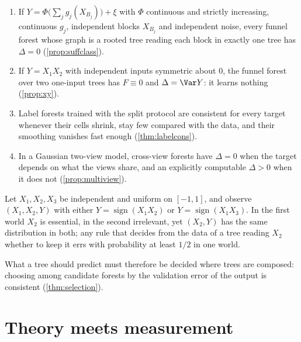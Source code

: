 \begin{proposition}\label{prop:tasks}
\leavevmode
\begin{enumerate}[label=(\alph*),leftmargin=*,noitemsep]
\item If $Y=\Phi\bigl(\sum_jg_j(X_{B_j})\bigr)+\xi$ with $\Phi$ continuous and strictly
  increasing, continuous $g_j$, independent blocks $X_{B_j}$ and independent noise, every
  funnel forest whose graph is a rooted tree reading each block in exactly one tree has
  $\Delta=0$ (\cref{prop:suffclass}).
\item If $Y=X_1X_2$ with independent inputs symmetric about $0$, the funnel forest over two
  one-input trees has $F\equiv0$ and $\Delta=\Var Y$: it learns nothing (\cref{prop:xy}).
\item Label forests trained with the split protocol are consistent for every target
  whenever their cells shrink, stay few compared with the data, and their smoothing
  vanishes fast enough (\cref{thm:labelcons}).
\item In a Gaussian two-view model, cross-view forests have $\Delta=0$ when the target
  depends on what the views share, and an explicitly computable $\Delta>0$ when it does not
  (\cref{prop:multiview}).
\end{enumerate}
\end{proposition}

\begin{proposition}\label{prop:local}
Let $X_1,X_2,X_3$ be independent and uniform on $[-1,1]$, and observe $(X_1,X_2,Y)$ with
either $Y=\operatorname{sign}(X_1X_2)$ or $Y=\operatorname{sign}(X_1X_3)$.  In the first world
$X_2$ is essential, in the second irrelevant, yet $(X_2,Y)$ has the same distribution in
both; any rule that decides from the data of a tree reading $X_2$ whether to keep it errs
with probability at least $1/2$ in one world.
\end{proposition}

What a tree should predict must therefore be decided where trees are composed: choosing
among candidate forests by the validation error of the output is consistent
(\cref{thm:selection}).

\section{Theory meets measurement}\label{sec:measure}

